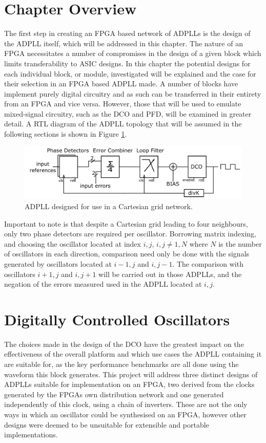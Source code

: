 \section{Chapter Overview}
The first step in creating an \ac{FPGA} based network of \ac{ADPLL}s is the design of the \ac{ADPLL} itself, which will be addressed in this chapter. The nature of an \ac{FPGA} necessitates a number of compromises in the design of a given block which limits transferability to \ac{ASIC} designs. In this chapter the potential designs for each individual block, or module, investigated will be explained and the case for their selection in an \ac{FPGA} based \ac{ADPLL} made. A number of blocks have implement purely digital circuitry and as such can be transferred in their entirety from an \ac{FPGA} and vice versa. However, those that will be used to emulate mixed-signal circuitry, such as the \ac{DCO} and \ac{PFD}, will be examined in greater detail. A \ac{RTL} diagram of the \ac{ADPLL} topology that will be assumed in the following sections is shown in Figure \ref{fig:network_adpll}.
\begin{figure}[h]
	\centering
	\includegraphics[width=\textwidth]{../network_adpll}
	\caption{\ac{ADPLL} designed for use in a Cartesian grid network.}
	\label{fig:network_adpll}
\end{figure}

Important to note is that despite a Cartesian grid leading to four neighbours, only two phase detectors are required per oscillator. Borrowing matrix indexing, and choosing the oscillator located at index $i,j$, $i,j \neq 1,N$ where $N$ is the number of oscillators in each direction, comparison need only be done with the signals generated by oscillators located at $i-1,j$ and $i,j-1$. The comparison with oscillators $i+1,j$ and $i,j+1$ will be carried out in those \ac{ADPLL}s, and the negation of the errors measured used in the \ac{ADPLL} located at $i,j$.

\section{Digitally Controlled Oscillators}
The choices made in the design of the \ac{DCO} have the greatest impact on the effectiveness of the overall platform and which use cases the \ac{ADPLL} containing it are suitable for, as the key performance benchmarks are all done using the waveform this block generates. This project will address three distinct designs of \ac{ADPLL}s suitable for implementation on an FPGA, two derived from the clocks generated by the \ac{FPGA}s own distribution network and one generated independently of this clock, using a chain of inverters. These are not the only ways in which an oscillator could be synthesised on an \ac{FPGA}, however other designs were deemed to be unsuitable for extensible and portable implementations.

